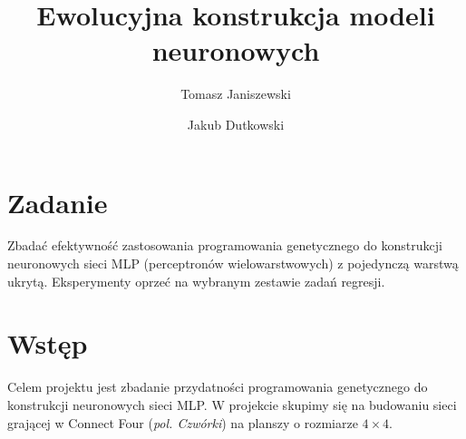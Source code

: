 \documentclass{llncs}
\begin{document}
\title{Ewolucyjna konstrukcja modeli neuronowych}
%
%
\author{Tomasz Janiszewski \and Jakub Dutkowski}
%
%


\maketitle              %

%
\section{Zadanie}
Zbadać efektywność zastosowania programowania genetycznego do konstrukcji neuronowych sieci MLP 
(perceptronów wielowarstwowych) z pojedynczą warstwą ukrytą.
Eksperymenty oprzeć na wybranym zestawie zadań regresji.

\section{Wstęp}
Celem projektu jest zbadanie przydatności programowania genetycznego do konstrukcji neuronowych sieci MLP.
W projekcie skupimy się na budowaniu sieci grającej w Connect Four (\emph{pol. Czwórki}) \cite{connect4:wiki}
na planszy o rozmiarze $4 \times 4$.
\end{document}
